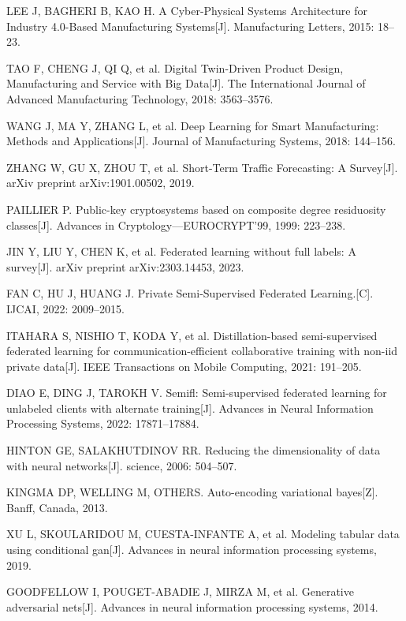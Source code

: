 \begin{thebibliography}{200}
	LEE J, BAGHERI B, KAO H. A Cyber-Physical Systems Architecture for Industry 4.0-Based Manufacturing Systems[J]. Manufacturing Letters, 2015: 18--23.
	
	TAO F, CHENG J, QI Q, et al. Digital Twin-Driven Product Design, Manufacturing and Service with Big Data[J]. The International Journal of Advanced Manufacturing Technology, 2018: 3563--3576.
	
	WANG J, MA Y, ZHANG L, et al. Deep Learning for Smart Manufacturing: Methods and Applications[J]. Journal of Manufacturing Systems, 2018: 144--156.
	
	ZHANG W, GU X, ZHOU T, et al. Short-Term Traffic Forecasting: A Survey[J]. arXiv preprint arXiv:1901.00502, 2019.
	
	PAILLIER P. Public-key cryptosystems based on composite degree residuosity classes[J]. Advances in Cryptology—EUROCRYPT'99, 1999: 223--238.
	
	JIN Y, LIU Y, CHEN K, et al. Federated learning without full labels: A survey[J]. arXiv preprint arXiv:2303.14453, 2023.
	
	FAN C, HU J, HUANG J. Private Semi-Supervised Federated Learning.[C]. IJCAI, 2022: 2009--2015.
	
	ITAHARA S, NISHIO T, KODA Y, et al. Distillation-based semi-supervised federated learning for communication-efficient collaborative training with non-iid private data[J]. IEEE Transactions on Mobile Computing, 2021: 191--205.
	
	DIAO E, DING J, TAROKH V. Semifl: Semi-supervised federated learning for unlabeled clients with alternate training[J]. Advances in Neural Information Processing Systems, 2022: 17871--17884.
	
	HINTON GE, SALAKHUTDINOV RR. Reducing the dimensionality of data with neural networks[J]. science, 2006: 504--507.
	
	KINGMA DP, WELLING M, OTHERS. Auto-encoding variational bayes[Z]. Banff, Canada, 2013.
	
	XU L, SKOULARIDOU M, CUESTA-INFANTE A, et al. Modeling tabular data using conditional gan[J]. Advances in neural information processing systems, 2019.
	
	GOODFELLOW I, POUGET-ABADIE J, MIRZA M, et al. Generative adversarial nets[J]. Advances in neural information processing systems, 2014.
	

\end{thebibliography}
